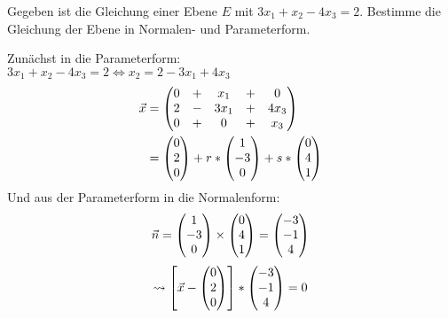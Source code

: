  Gegeben ist die Gleichung einer Ebene $E$ mit $3x_1+x_2-4x_3=2$. Bestimme die Gleichung der Ebene in Normalen- und Parameterform.
\begin{lsg}{}
	Zunächst in die Parameterform:\\
	$3x_1+x_2-4x_3=2 \Longleftrightarrow x_2=2-3x_1+4x_3$
	\begin{align*}
		\vec x &=\begin{pmatrix} 0 &+& x_1 &+& 0\\2 &-& 3x_1 &+& 4x_3\\0 &+& 0 &+& x_3 \end{pmatrix}\\
						&=\begin{pmatrix} 0\\2\\0 \end{pmatrix}+r*\begin{pmatrix} 1\\-3\\0 \end{pmatrix}+s*\begin{pmatrix} 0\\4\\1 \end{pmatrix}
	\end{align*}
	Und aus der Parameterform in die Normalenform:
	\begin{equation*}
		\vec n=\begin{pmatrix} 1\\-3\\0 \end{pmatrix}\times\begin{pmatrix} 0\\4\\1 \end{pmatrix}=\begin{pmatrix} -3\\-1\\4 \end{pmatrix}
	\end{equation*}
	\begin{equation*}
		\rightsquigarrow \left[\vec x-\begin{pmatrix} 0\\2\\0 \end{pmatrix}\right]*\begin{pmatrix} -3\\-1\\4 \end{pmatrix}=0
	\end{equation*}
\end{lsg}


